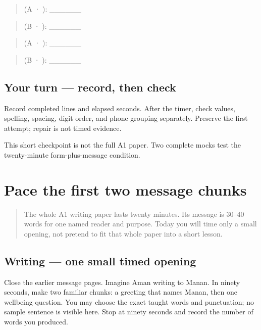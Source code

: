 \begin{quote}
 (A · ): \_\_\_\_\_\_
\end{quote}

\begin{quote}
 (B · ): \_\_\_\_\_\_
\end{quote}

\begin{quote}
 (A · ): \_\_\_\_\_\_
\end{quote}

\begin{quote}
 (B · ): \_\_\_\_\_\_
\end{quote}

\subsection*{Your turn — record, then check}
Record completed lines and elapsed seconds. After the timer, check values, spelling, spacing, digit order, and phone grouping separately. Preserve the first attempt; repair is not timed evidence.

\begin{tcolorbox}[breakable,colback=teal!4,colframe=teal!35!black,title={Before you move on}]
This short checkpoint is not the full A1 paper. Two complete mocks test the twenty-minute form-plus-message condition.
\end{tcolorbox}
\section[(named reader, short clock)]{Pace the first two message chunks}

\label{lesson:PA-W13-message-pacing}



\begin{quote}
The whole A1 writing paper lasts twenty minutes. Its message is 30–40 words for one named reader and purpose. Today you will time only a small opening, not pretend to fit that whole paper into a short lesson.
\end{quote}

\subsection*{Writing — one small timed opening}
Close the earlier message pages. Imagine Aman writing to Manan. In ninety seconds, make two familiar chunks: a greeting that names Manan, then one wellbeing question. You may choose the exact taught words and punctuation; no sample sentence is visible here. Stop at ninety seconds and record the number of words you produced.

